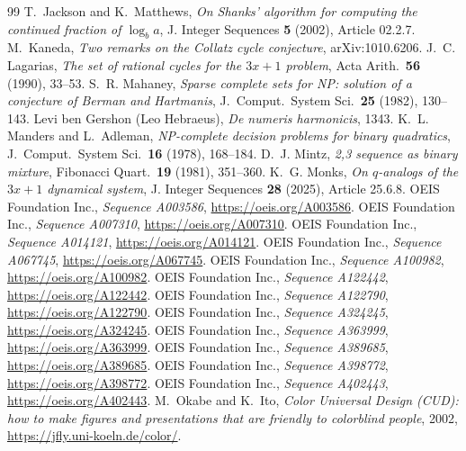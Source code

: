 \documentclass[10pt,a4paper,titlepage]{article}
\begin{document}
\begin{thebibliography}{99}
 T.~Jackson and K.~Matthews, \emph{On Shanks' algorithm for
  computing the continued fraction of $\log_b a$}, J. Integer Sequences \textbf{5} (2002),
  Article 02.2.7.
 M.~Kaneda, \emph{Two remarks on the Collatz cycle conjecture},
arXiv:1010.6206.
 J.~C. Lagarias, \emph{The set of rational cycles for the $3x+1$ problem},
  Acta Arith.\ \textbf{56} (1990), 33--53.
 S.~R. Mahaney, \emph{Sparse complete sets for NP: solution of a
  conjecture of Berman and Hartmanis}, J.\ Comput.\ System Sci.\ \textbf{25} (1982),
  130--143.
 Levi ben Gershon (Leo Hebraeus), \emph{De numeris harmonicis}, 1343.
 K.~L. Manders and L.~Adleman, \emph{NP-complete decision
  problems for binary quadratics}, J.\ Comput.\ System Sci.\ \textbf{16} (1978), 168--184.
 D.~J. Mintz, \emph{2,3 sequence as binary mixture}, Fibonacci
  Quart.\ \textbf{19} (1981), 351--360.
 K.~G. Monks, \emph{On $q$-analogs of the $3x + 1$ dynamical system},
  J. Integer Sequences \textbf{28} (2025), Article 25.6.8.
 OEIS Foundation Inc., \emph{Sequence A003586},
  \url{https://oeis.org/A003586}.
 OEIS Foundation Inc., \emph{Sequence A007310},
  \url{https://oeis.org/A007310}.
 OEIS Foundation Inc., \emph{Sequence A014121},
  \url{https://oeis.org/A014121}.
 OEIS Foundation Inc., \emph{Sequence A067745},
  \url{https://oeis.org/A067745}.
 OEIS Foundation Inc., \emph{Sequence A100982},
  \url{https://oeis.org/A100982}.
 OEIS Foundation Inc., \emph{Sequence A122442},
  \url{https://oeis.org/A122442}.
 OEIS Foundation Inc., \emph{Sequence A122790},
  \url{https://oeis.org/A122790}.
 OEIS Foundation Inc., \emph{Sequence A324245},
  \url{https://oeis.org/A324245}.
 OEIS Foundation Inc., \emph{Sequence A363999},
  \url{https://oeis.org/A363999}.
 OEIS Foundation Inc., \emph{Sequence A389685},
  \url{https://oeis.org/A389685}.
 OEIS Foundation Inc., \emph{Sequence A398772},
  \url{https://oeis.org/A398772}.
 OEIS Foundation Inc., \emph{Sequence A402443},
  \url{https://oeis.org/A402443}.
 M.~Okabe and K.~Ito, \emph{Color Universal Design (CUD): how to make figures and
  presentations that are friendly to colorblind people}, 2002, \url{https://jfly.uni-koeln.de/color/}.

\end{thebibliography}
\end{document}
